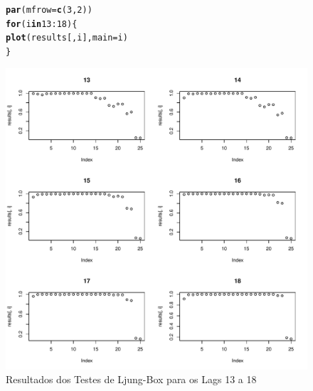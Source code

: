 \documentclass{article}\usepackage[]{graphicx}\usepackage[]{color}
\makeatletter
\def\maxwidth{ %
  \ifdim\Gin@nat@width>\linewidth
    \linewidth
  \else
    \Gin@nat@width
  \fi
}
\newcommand{\hlnum}[1]{\textcolor[rgb]{0.686,0.059,0.569}{#1}}%
\newcommand{\hlopt}[1]{\textcolor[rgb]{0,0,0}{#1}}%
\newcommand{\hlstd}[1]{\textcolor[rgb]{0.345,0.345,0.345}{#1}}%
\newcommand{\hlkwa}[1]{\textcolor[rgb]{0.161,0.373,0.58}{\textbf{#1}}}%
\newcommand{\hlkwc}[1]{\textcolor[rgb]{0.333,0.667,0.333}{#1}}%
\newcommand{\hlkwd}[1]{\textcolor[rgb]{0.737,0.353,0.396}{\textbf{#1}}}%
\newenvironment{kframe}{%
 \def\at@end@of@kframe{}%
 \ifinner\ifhmode%
  \def\at@end@of@kframe{\end{minipage}}%
  \begin{minipage}{\columnwidth}%
 \fi\fi%
 \def\FrameCommand##1{\hskip\@totalleftmargin \hskip-\fboxsep
 \colorbox{shadecolor}{##1}\hskip-\fboxsep
     \hskip-\linewidth \hskip-\@totalleftmargin \hskip\columnwidth}%
 \MakeFramed {\advance\hsize-\width
   \@totalleftmargin\z@ \linewidth\hsize
   \@setminipage}}%
 {\par\unskip\endMakeFramed%
 \at@end@of@kframe}
\newenvironment{knitrout}{}{} %
\makeatother
\begin{document}
            \begin{figure}[H]
            \caption{Resultados dos Testes de Ljung-Box para os Lags 13 a 18}
            \centering
\begin{knitrout}
\color{fgcolor}\begin{kframe}
\begin{alltt}
\hlkwd{par}\hlstd{(}\hlkwc{mfrow} \hlstd{=} \hlkwd{c}\hlstd{(}\hlnum{3}\hlstd{,}\hlnum{2}\hlstd{))}
\hlkwa{for} \hlstd{(i} \hlkwa{in} \hlnum{13}\hlopt{:}\hlnum{18}\hlstd{)\{}
  \hlkwd{plot}\hlstd{(results[,i],} \hlkwc{main}\hlstd{=i)}
\hlstd{\}}
\end{alltt}
\end{kframe}
\includegraphics[width=\maxwidth]{figure/unnamed-chunk-81-1} 

\end{knitrout}
            \end{figure}
\end{document}
